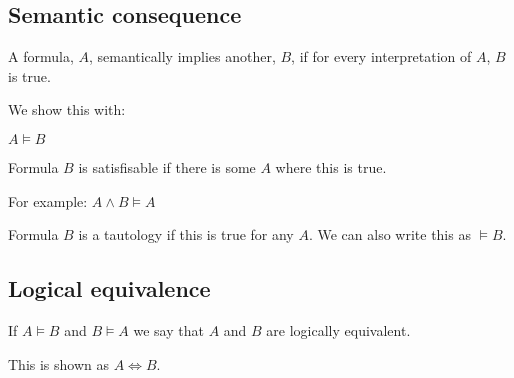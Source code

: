 \subsection{Semantic consequence}

A formula, \(A\), semantically implies another, \(B\), if for every interpretation of \(A\), \(B\) is true.

We show this with:

$A\vDash B$

Formula \(B\) is satisfisable if there is some \(A\) where this is true.

For example:
$A\land B \vDash A$

Formula \(B\) is a tautology if this is true for any \(A\). We can also write this as \(\vDash B\).

\subsection{Logical equivalence}

If \(A\vDash B\) and \(B\vDash A\) we say that \(A\) and \(B\) are logically equivalent.

This is shown as \(A \Leftrightarrow B\).
